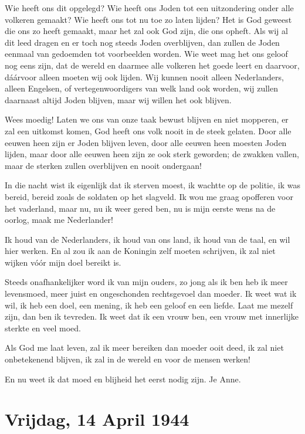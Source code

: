 \documentclass{book}
\begin{document}
Wie heeft ons dit opgelegd? Wie heeft ons Joden tot een uitzondering
onder alle volkeren gemaakt? Wie heeft ons tot nu toe zo laten lijden?
Het is God geweest die ons zo heeft gemaakt, maar het zal ook God zijn,
die ons opheft. Als wij al dit leed dragen en er toch nog steeds Joden
overblijven, dan zullen de Joden eenmaal van gedoemden tot voorbeelden
worden. Wie weet mag het ons geloof nog eens zijn, dat de wereld en
daarmee alle volkeren het goede leert en daarvoor, dáárvoor alleen
moeten wij ook lijden. Wij kunnen nooit alleen Nederlanders, alleen
Engelsen, of vertegenwoordigers van welk land ook worden, wij zullen
daarnaast altijd Joden blijven, maar wij willen het ook blijven.

Wees moedig! Laten we ons van onze taak bewust blijven en niet mopperen,
er zal een uitkomst komen, God heeft ons volk nooit in de steek gelaten.
Door alle eeuwen heen zijn er Joden blijven leven, door alle eeuwen heen
moesten Joden lijden, maar door alle eeuwen heen zijn ze ook sterk
geworden; de zwakken vallen, maar de sterken zullen overblijven en nooit
ondergaan!

In die nacht wist ik eigenlijk dat ik sterven moest, ik wachtte op de
politie, ik was bereid, bereid zoals de soldaten op het slagveld. Ik wou
me graag opofferen voor het vaderland, maar nu, nu ik weer gered ben, nu
is mijn eerste wens na de oorlog, maak me Nederlander!

Ik houd van de Nederlanders, ik houd van ons land, ik houd van de taal,
en wil hier werken. En al zou ik aan de Koningin zelf moeten schrijven,
ik zal niet wijken vóór mijn doel bereikt is.

Steeds onafhankelijker word ik van mijn ouders, zo jong als ik ben heb
ik meer levensmoed, meer juist en ongeschonden rechtsgevoel dan moeder.
Ik weet wat ik wil, ik heb een doel, een mening, ik heb een geloof en
een liefde. Laat me mezelf zijn, dan ben ik tevreden. Ik weet dat ik een
vrouw ben, een vrouw met innerlijke sterkte en veel moed.

Als God me laat leven, zal ik meer bereiken dan moeder ooit deed, ik zal
niet onbetekenend blijven, ik zal in de wereld en voor de mensen werken!

En nu weet ik dat moed en blijheid het eerst nodig zijn. Je Anne.

\chapter{Vrijdag, 14 April 1944}
\end{document}
